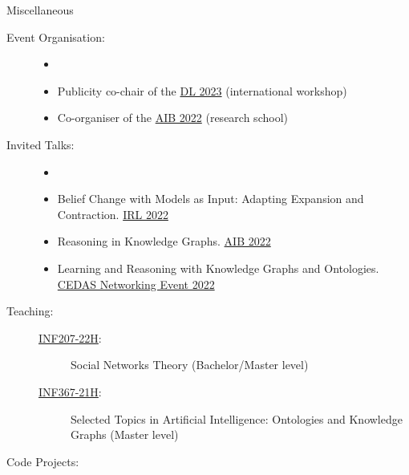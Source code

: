 %

\begin{rSection}{Miscellaneous}
    \begin{description}
        \item[Event Organisation:] {
            \begin{itemize}
                \item[]
                \item Publicity co-chair of the \href{https://dl2023.w.uib.no/}{DL 2023} (international workshop)
                \item Co-organiser of the \href{https://researchschool.w.uib.no/}{AIB 2022} (research school) 
            \end{itemize}
        }
        \item[Invited Talks:]{
            \begin{itemize}
                \item[]
                \item Belief Change with Models as Input: Adapting Expansion and Contraction. \href{https://web.archive.org/web/20221205091252/https://irl.w.uib.no/}{IRL 2022}
                \item Reasoning in Knowledge Graphs. \href{https://researchschool.w.uib.no/}{AIB 2022}
                \item Learning and Reasoning with Knowledge Graphs and Ontologies. \href{https://web.archive.org/web/20221022003238/http://www.uib.no/en/cedas/154942/cedas-networking-event-2022#}{CEDAS Networking Event 2022}
            \end{itemize}
        }
        \item[Teaching:]{
            \begin{description}
                \item[]
                \item [\href{https://web.archive.org/web/20220707214216/https://www.uib.no/en/course/INF207}{INF207-22H}:] Social Networks Theory (Bachelor/Master level)
                \item [\href{https://web.archive.org/web/20210918132515/https://www.uib.no/en/course/INF367}{INF367-21H}:] Selected Topics in Artificial Intelligence: Ontologies and Knowledge Graphs (Master level)
            \end{description}
        }
        \item[Code Projects:]{
}
\end{description}
\end{rSection}
